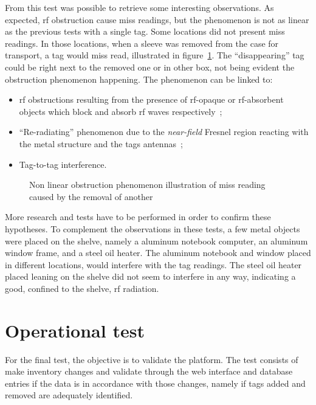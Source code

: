 From this test was possible to retrieve some interesting observations. 
As expected, \ac{rf} obstruction cause miss readings, but the phenomenon is not as linear as the previous tests with a single tag. 
Some locations did not present miss readings. In those locations, when a sleeve was removed from the case for transport, a tag would miss read, illustrated in figure~\ref{fig:missreading}. The ``disappearing'' tag could be right next to the removed one or in other box, not being evident the obstruction phenomenon happening.
The phenomenon can be linked to:

\begin{itemize}
    \item \ac{rf} obstructions resulting from the presence of \ac{rf}-opaque or \ac{rf}-absorbent objects which block and absorb \ac{rf} waves respectively~\cite{lahiriRFIDSourcebook2005};
    \item ``Re-radiating'' phenomenon due to the \emph{near-field} Fresnel region reacting with the metal structure and the tags antennas~\cite{ElectromagneticRadiationField};
    \item Tag-to-tag interference.
\end{itemize}

\begin{figure}
    \centering
    \caption{Non linear obstruction phenomenon illustration of miss reading caused by the removal of another}
    \label{fig:missreading}
\end{figure}

More research and tests have to be performed in order to confirm these hypotheses.
To complement the observations in these tests, a few metal objects were placed on the shelve, namely a aluminum notebook computer, an aluminum window frame, and a steel oil heater.
The aluminum notebook and window placed in different locations, would interfere with the tag readings. The steel oil heater placed leaning on the shelve did not seem to interfere in any way, indicating a good, confined to the shelve, \ac{rf} radiation.

\section{Operational test}

For the final test, the objective is to validate the platform.
The test consists of make inventory changes and validate through the web interface and database entries if the data is in accordance with those changes, namely if tags added and removed are adequately identified.

